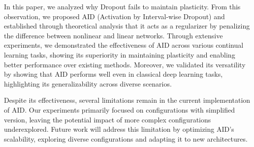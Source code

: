 
In this paper, we analyzed why Dropout fails to maintain plasticity.
From this observation, we proposed AID (Activation by Interval-wise Dropout) and established through theoretical analysis that it acts as a regularizer by penalizing the difference between nonlinear and linear networks.
Through extensive experiments, we demonstrated the effectiveness of AID across various continual learning tasks, showing its superiority in maintaining plasticity and enabling better performance over existing methods.
Moreover, we validated its versatility by showing that AID performs well even in classical deep learning tasks, highlighting its generalizability across diverse scenarios.

Despite its effectiveness, several limitations remain in the current implementation of AID.
Our experiments primarily focused on configurations with simplified version, leaving the potential impact of more complex configurations underexplored.
Future work will address this limitation by optimizing AID’s scalability, exploring diverse configurations and adapting it to new architectures.

